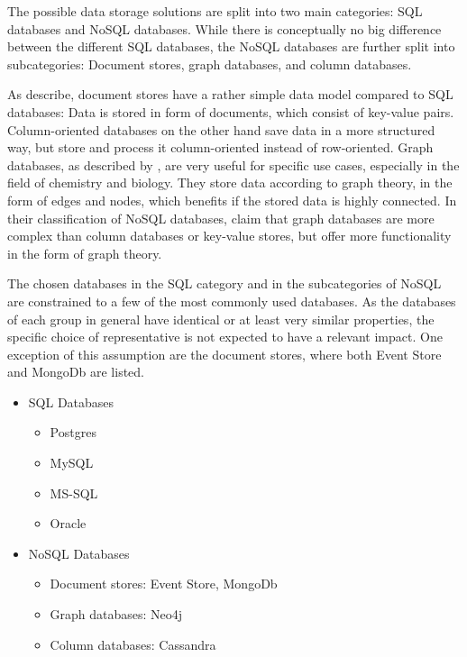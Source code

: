 The possible data storage solutions are split into two main categories: \ac{SQL} databases and \ac{NoSQL} databases.
While there is conceptually no big difference between the different \ac{SQL} databases, the \ac{NoSQL} databases are further split into subcategories: Document stores, graph databases, and column databases.

As \citet{strauch2011nosql} describe, document stores have a rather simple data model compared to \ac{SQL} databases:
Data is stored in form of documents, which consist of key-value pairs.
Column-oriented databases on the other hand save data in a more structured way, but store and process it column-oriented instead of row-oriented.
Graph databases, as described by \citet{miller2013graph}, are very useful for specific use cases, especially in the field of chemistry and biology.
They store data according to graph theory, in the form of edges and nodes, which benefits if the stored data is highly connected.
In their classification of \ac{NoSQL} databases, \citet{popescu2010nosql} claim that graph databases are more complex than column databases or key-value stores, but offer more functionality in the form of graph theory.

The chosen databases in the \ac{SQL} category and in the subcategories of \ac{NoSQL} are constrained to a few of the most commonly used databases.
As the databases of each group in general have identical or at least very similar properties, the specific choice of representative is not expected to have a relevant impact.
One exception of this assumption are the document stores, where both Event Store and MongoDb are listed.

\begin{itemize}[noitemsep]
\item \ac{SQL} Databases
\begin{itemize}[noitemsep]
\item Postgres
\item MySQL
\item MS-SQL
\item Oracle
\end{itemize}
\item NoSQL Databases
\begin{itemize}[noitemsep]
\item Document stores: Event Store, MongoDb
\item Graph databases: Neo4j
\item Column databases: Cassandra
\end{itemize}
\end{itemize}

